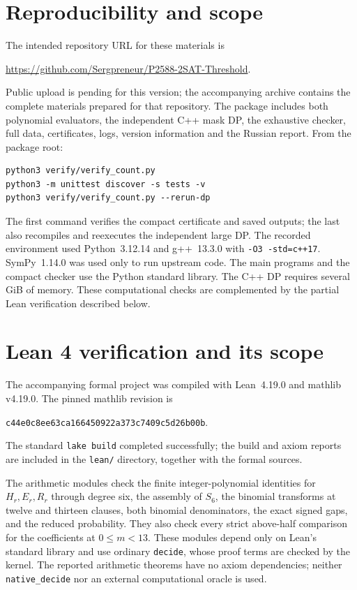 \documentclass[11pt,a4paper]{article}
\begin{document}
\section{Reproducibility and scope}
The intended repository URL for these materials is
\begin{center}
\url{https://github.com/Sergpreneur/P2588-2SAT-Threshold}.
\end{center}
Public upload is pending for this version; the accompanying archive contains
the complete materials prepared for that repository.
The package includes both polynomial evaluators, the independent C++ mask DP,
the exhaustive checker, full data, certificates, logs, version information and
the Russian report. From the package root:
\begin{verbatim}
python3 verify/verify_count.py
python3 -m unittest discover -s tests -v
python3 verify/verify_count.py --rerun-dp
\end{verbatim}
The first command verifies the compact certificate and saved outputs; the last
also recompiles and reexecutes the independent large DP. The recorded
environment used Python~3.12.14 and g++~13.3.0 with \texttt{-O3 -std=c++17}.
SymPy~1.14.0 was used only to run upstream code. The main programs and the compact
checker use the Python standard library. The C++ DP requires several GiB of
memory. These computational checks are complemented by the partial Lean
verification described below.

\section{Lean 4 verification and its scope}\label{sec:lean}
The accompanying formal project was compiled with Lean~4.19.0 and mathlib
v4.19.0. The pinned mathlib revision is
\begin{center}\texttt{c44e0c8ee63ca166450922a373c7409c5d26b00b}.\end{center}
The standard
\texttt{lake build} completed successfully; the build and axiom reports are
included in the \texttt{lean/} directory, together with the formal sources.

The arithmetic modules check the finite integer-polynomial identities for
$H_r,E_r,R_r$ through degree six, the assembly of $S_6$, the binomial transforms
at twelve and thirteen clauses, both binomial denominators, the exact signed
gaps, and the reduced probability. They also check every strict above-half
comparison for the coefficients at $0\le m<13$. These modules depend only on
Lean's standard library and use ordinary \texttt{decide}, whose proof terms
are checked by the kernel. The reported arithmetic theorems have no axiom
dependencies; neither \texttt{native\_decide} nor an external computational
oracle is used.
\end{document}
